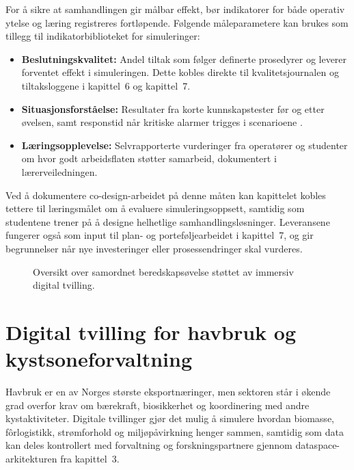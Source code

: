 For å sikre at samhandlingen gir målbar effekt, bør indikatorer for både operativ ytelse og læring registreres fortløpende. Følgende måleparametere kan brukes som tillegg til indikatorbiblioteket for simuleringer:
\begin{itemize}
    \item \textbf{Beslutningskvalitet:} Andel tiltak som følger definerte prosedyrer og leverer forventet effekt i simuleringen. Dette kobles direkte til kvalitetsjournalen og tiltaksloggene i kapittel~6 og kapittel~7.
    \item \textbf{Situasjonsforståelse:} Resultater fra korte kunnskapstester før og etter øvelsen, samt responstid når kritiske alarmer trigges i scenarioene \citep{dsb2023ovelser}.
    \item \textbf{Læringsopplevelse:} Selvrapporterte vurderinger fra operatører og studenter om hvor godt arbeidsflaten støtter samarbeid, dokumentert i lærerveiledningen.
\end{itemize}

Ved å dokumentere co-design-arbeidet på denne måten kan kapittelet kobles tettere til læringsmålet om å evaluere simuleringsoppsett, samtidig som studentene trener på å designe helhetlige samhandlingsløsninger. Leveransene fungerer også som input til plan- og porteføljearbeidet i kapittel~7, og gir begrunnelser når nye investeringer eller prosessendringer skal vurderes.

\begin{figure}[htbp]
    \centering
    \caption{Oversikt over samordnet beredskapsøvelse støttet av immersiv digital tvilling.}
    \label{fig:kap04-beredskap-case}
\end{figure}

\section{Digital tvilling for havbruk og kystsoneforvaltning}
Havbruk er en av Norges største eksportnæringer, men sektoren står i økende grad overfor krav om bærekraft, biosikkerhet og koordinering med andre kystaktiviteter. Digitale tvillinger gjør det mulig å simulere hvordan biomasse, fôrlogistikk, strømforhold og miljøpåvirkning henger sammen, samtidig som data kan deles kontrollert med forvaltning og forskningspartnere gjennom dataspace-arkitekturen fra kapittel~3.\citep{sintef2023havbrukstvilling}

